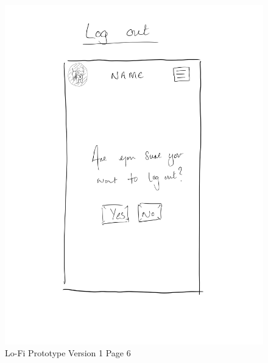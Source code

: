 \documentclass{ueacmpstyle}
\begin{document}
            \begin{figure}[h]
                
                \includegraphics[width=\linewidth]{Images/Lofi_v1_f.jpg}
                \caption{Lo-Fi Prototype Version 1 Page 6}
                \label{Figure Lofi v1 6}
                
            \end{figure}
            \clearpage
            
\end{document}
